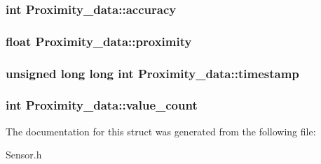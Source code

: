 \subsubsection[{accuracy}]{\setlength{\rightskip}{0pt plus 5cm}int Proximity\-\_\-data\-::accuracy}\label{structProximity__data_a0f0dfb5e5b6095d725f44e5cdd1bc389}
\subsubsection[{proximity}]{\setlength{\rightskip}{0pt plus 5cm}float Proximity\-\_\-data\-::proximity}\label{structProximity__data_a887e949cf8d3ba5851dc0982b12b28d6}
\subsubsection[{timestamp}]{\setlength{\rightskip}{0pt plus 5cm}unsigned long long int Proximity\-\_\-data\-::timestamp}\label{structProximity__data_afc13156ab5ec4e49defdd853f80b3e7e}
\subsubsection[{value\-\_\-count}]{\setlength{\rightskip}{0pt plus 5cm}int Proximity\-\_\-data\-::value\-\_\-count}\label{structProximity__data_ad4be86635ea4960c502c58c0431de92b}


The documentation for this struct was generated from the following file\-:\begin{DoxyCompactItemize}
\item 
Sensor.\-h\end{DoxyCompactItemize}
